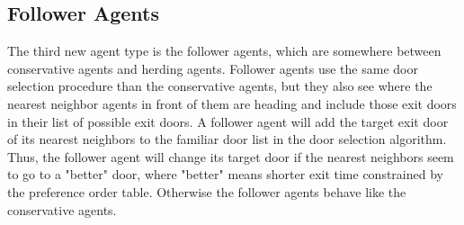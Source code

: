 \documentclass[12pt,a4paper,final,twoside]{stylevk}
\begin{document}
\subsection{Follower Agents}\label{Sec_FollowerAgents}

\noindent The third new agent type is the follower agents, which are
somewhere between conservative agents and herding agents.  Follower
agents use the same door selection procedure than the conservative
agents, but they also see where the nearest neighbor agents in front
of them are heading and include those exit doors in their list of
possible exit doors.  A follower agent will add the target exit door
of its nearest neighbors to the familiar door list in the door
selection algorithm.  Thus, the follower agent will change its target
door if the nearest neighbors seem to go to a "better" door, where
"better" means shorter exit time constrained by the preference order
table.  Otherwise the follower agents behave like the conservative
agents.




\end{document}
